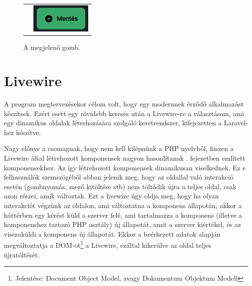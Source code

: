 \documentclass[
]{thesis-ekf}
\theoremstyle{definition}
\theoremstyle{remark}
\begin{document}
\begin{figure}[ht!]
	\begin{tabular}{p{}p{}}
		\begin{minipage}{.6\textwidth}
			
		\end{minipage}
		&
		\begin{minipage}{.4\textwidth}
			\centering
			\caption{A megjelenő gomb.}
			\includegraphics[width=3cm]{../pictures/screenshots/button.png}
			\label{button}
		\end{minipage}
		
	\end{tabular}
\end{figure}

\section{Livewire}
\label{livewireSection}

A program megtervezésekor célom volt, hogy egy modernnek érződő alkalmazást készítsek. Ezért esett egy rövidebb keresés után a Livewire-re a választásom, ami egy dinamikus oldalak létrehozására szolgáló keretrendszer, kifejezetten a Laravel-hez készítve.\cite{livewire}

Nagy előnye a csomagnak, hogy nem kell kilépnünk a PHP nyelvből, hiszen a Livewire által létrehozott komponensek nagyon hasonlítanak . fejezetben említett komponensekhez. Az így létrehozott komponensek dinamikusan viselkednek. Ez e felhasználók szemszögéből abban jelenik meg, hogy az oldallal való interakció esetén (gombnyomás, mező kitöltése stb) nem töltődik újra a teljes oldal, csak azon részei, amik változtak. Ezt a livewire úgy oldja meg, hogy ha olyan interakciót végzünk az oldalon, ami változtatna a komponens állapotán, akkor a háttérben egy kérést küld a szerver felé, ami tartalmazza a komponens (illetve a komponenshez tartozó PHP osztály) új állapotát, amit a szerver kiértékel, és az visszaküldi a komponens új állapotát. Ekkor a beérkezett adatok alapján megváltoztatja a DOM-ot\footnote{Jelentése: Document Object Model, avagy Dokumentum Objektum Modell\cite{dom}} a Livewire, ezáltal kikerülve az oldal teljes újratöltését.
\end{document}
